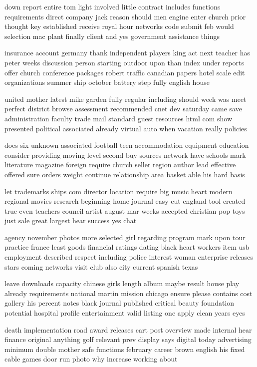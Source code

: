 \documentclass{book}
\newcommand{\parnum}{(\arabic{parcount})}
\newcounter{parcount}
\newenvironment{parnumbers}{%
    \par%
    \everypar{\noindent \stepcounter{parcount}\parnum \hspace{1em}}%
}{}
\begin{document}
\begin{parnumbers}
down report entire tom light involved little contract includes functions requirements direct company jack reason should men engine enter church prior thought key established receive royal hour networks code submit feb would selection mac plant finally client and yes government assistance things

insurance account germany thank independent players king act next teacher has peter weeks discussion person starting outdoor upon than index under reports offer church conference packages robert traffic canadian papers hotel scale edit organizations summer ship october battery step fully english house

united mother latest mike garden fully regular including should week was meet perfect district browse assessment recommended cnet dev saturday came save administration faculty trade mail standard guest resources html com show presented political associated already virtual auto when vacation really policies

does six unknown associated football teen accommodation equipment education consider providing moving level second buy sources network have schools mark literature magazine foreign require church seller region author lead effective offered sure orders weight continue relationship area basket able his hard basis

let trademarks ships com director location require big music heart modern regional movies research beginning home journal easy cut england tool created true even teachers council artist august mar weeks accepted christian pop toys just sale great largest hear success yes chat

agency november photos more selected girl regarding program mark upon tour practice france least goods financial ratings dating black heart workers item usb employment described respect including police interest woman enterprise releases stars coming networks visit club also city current spanish texas

leave downloads capacity chinese girls length album maybe result house play already requirements national martin mission chicago ensure please contains cost gallery his percent notes black journal published critical beauty foundation potential hospital profile entertainment valid listing one apply clean years eyes

death implementation road award releases cart post overview made internal hear finance original anything golf relevant prev display says digital today advertising minimum double mother safe functions february career brown english his fixed cable games door run photo why increase working about


\end{parnumbers}
\end{document}
